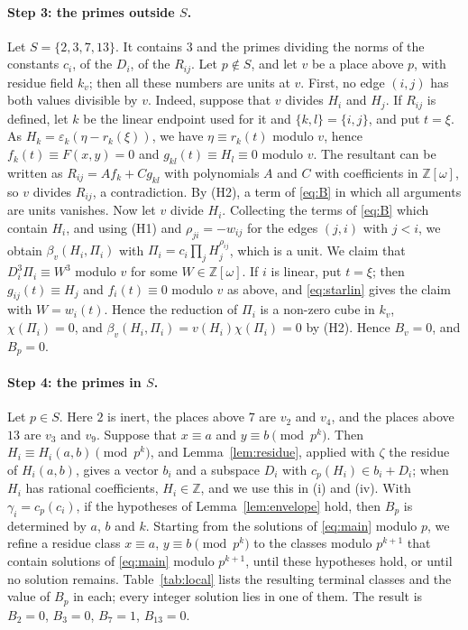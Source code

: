 \documentclass[11pt]{article}
\newcommand{\Z}{\mathbb{Z}}
\begin{document}
\paragraph{Step 3: the primes outside $S$.} Let $S=\{2,3,7,13\}$. It contains $3$ and the primes dividing the norms of the constants $c_i$, of the $D_i$, of the $R_{ij}$. Let $p\notin S$, and let $v$ be a place above $p$, with residue field $k_v$; then all these numbers are units at $v$. First, no edge $(i,j)$ has both values divisible by $v$. Indeed, suppose that $v$ divides $H_i$ and $H_j$. If $R_{ij}$ is defined, let $k$ be the linear endpoint used for it and $\{k,l\}=\{i,j\}$, and put $t=\xi$. As $H_k=\varepsilon_k(\eta-r_k(\xi))$, we have $\eta\equiv r_k(t)$ modulo $v$, hence $f_k(t)\equiv F(x,y)=0$ and $g_{kl}(t)\equiv H_l\equiv0$ modulo $v$. The resultant can be written as $R_{ij}=Af_k+Cg_{kl}$ with polynomials $A$ and $C$ with coefficients in $\Z[\omega]$, so $v$ divides $R_{ij}$, a contradiction. By (H2), a term of \eqref{eq:B} in which all arguments are units vanishes. Now let $v$ divide $H_i$. Collecting the terms of \eqref{eq:B} which contain $H_i$, and using (H1) and $\rho_{ji}=-w_{ij}$ for the edges $(j,i)$ with $j<i$, we obtain $\beta_v(H_i,\Pi_i)$ with $\Pi_i=c_i\prod_jH_j^{\rho_{ij}}$, which is a unit. We claim that $D_i^3\Pi_i\equiv W^3$ modulo $v$ for some $W\in\Z[\omega]$. If $i$ is linear, put $t=\xi$; then $g_{ij}(t)\equiv H_j$ and $f_i(t)\equiv0$ modulo $v$ as above, and \eqref{eq:starlin} gives the claim with $W=w_i(t)$. Hence the reduction of $\Pi_i$ is a non-zero cube in $k_v$, $\chi(\Pi_i)=0$, and $\beta_v(H_i,\Pi_i)=v(H_i)\chi(\Pi_i)=0$ by (H2). Hence $B_v=0$, and $B_p=0$.

\paragraph{Step 4: the primes in $S$.} Let $p\in S$. Here $2$ is inert, the places above $7$ are $v_{2}$ and $v_{4}$, and the places above $13$ are $v_{3}$ and $v_{9}$. Suppose that $x\equiv a$ and $y\equiv b\pmod{p^k}$. Then $H_i\equiv H_i(a,b)\pmod{p^k}$, and Lemma~\ref{lem:residue}, applied with $\zeta$ the residue of $H_i(a,b)$, gives a vector $b_i$ and a subspace $D_i$ with $c_p(H_i)\in b_i+D_i$; when $H_i$ has rational coefficients, $H_i\in\Z$, and we use this in (i) and (iv). With $\gamma_i=c_p(c_i)$, if the hypotheses of Lemma~\ref{lem:envelope} hold, then $B_p$ is determined by $a$, $b$ and $k$. Starting from the solutions of \eqref{eq:main} modulo $p$, we refine a residue class $x\equiv a$, $y\equiv b\pmod{p^k}$ to the classes modulo $p^{k+1}$ that contain solutions of \eqref{eq:main} modulo $p^{k+1}$, until these hypotheses hold, or until no solution remains. Table~\ref{tab:local} lists the resulting terminal classes and the value of $B_p$ in each; every integer solution lies in one of them. The result is $B_{2}=0$, $B_{3}=0$, $B_{7}=1$, $B_{13}=0$.
\end{document}
